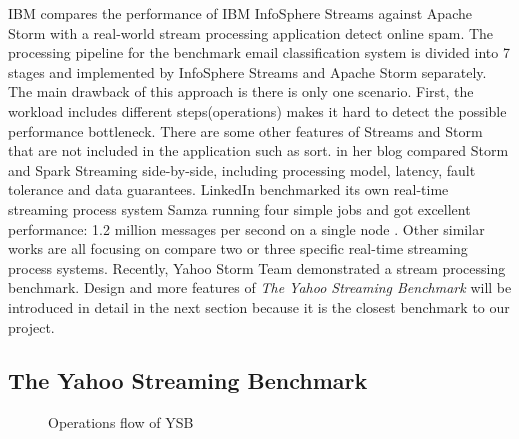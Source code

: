 IBM compares the performance of IBM InfoSphere Streams against Apache Storm with a real-world stream processing application detect online spam. \cite{ibm2014streams} The processing pipeline for the benchmark email classification system is divided into 7 stages and implemented by InfoSphere Streams and Apache Storm separately. The main drawback of this approach is there is only one scenario. First, the workload includes different steps(operations) makes it hard to detect the possible performance bottleneck. There are some other features of Streams and Storm that are not included in the application such as sort. \citet{xinhstechblog} in her blog compared Storm and Spark Streaming side-by-side, including processing model, latency, fault tolerance and data guarantees. LinkedIn benchmarked its own real-time streaming process system Samza running four simple jobs and got excellent performance: 1.2 million messages per second on a single node \cite{samza-benchmark}. Other similar works \cite{manoj-sotrm-vs-spark,flink-latency} are all focusing on compare two or three specific real-time streaming process systems. Recently, Yahoo Storm Team demonstrated a stream processing benchmark. Design and more features of \textit{The Yahoo Streaming Benchmark} will be introduced in detail in the next section because it is the closest benchmark to our project.

\subsection{The Yahoo Streaming Benchmark}
\label{subsection:ysb}


\begin{figure}
  \begin{center}
   \caption{Operations flow of YSB \cite{YSB}}
   \label{fig:yahoo_stream_bench}
  \end{center}
\end{figure}


